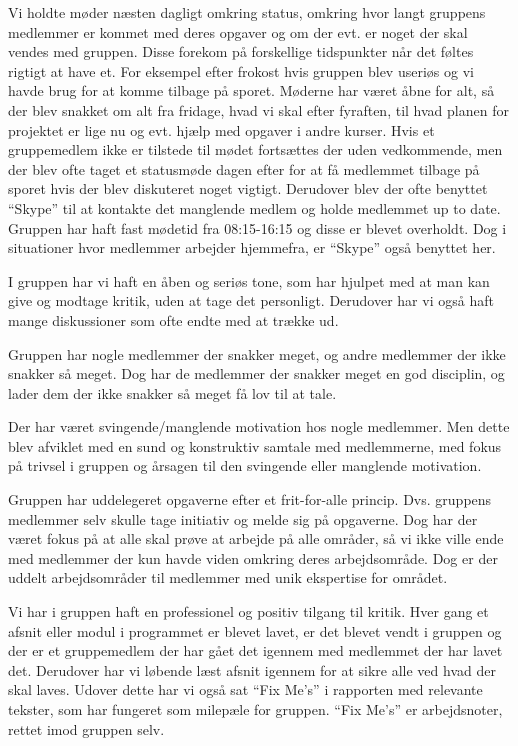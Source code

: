 \documentclass[a4paper,12pt,oneside]{article}
\begin{document}
Vi holdte møder næsten dagligt omkring status, omkring hvor langt gruppens medlemmer er kommet med deres opgaver og om der evt. er noget der skal vendes med gruppen. Disse forekom på forskellige tidspunkter når det føltes rigtigt at have et. For eksempel efter frokost hvis gruppen blev useriøs og vi havde brug for at komme tilbage på sporet. Møderne har været åbne for alt, så der blev snakket om alt fra fridage, hvad vi skal efter fyraften, til hvad planen for projektet er lige nu og evt. hjælp med opgaver i andre kurser. Hvis et gruppemedlem ikke er tilstede til mødet fortsættes der uden vedkommende, men der blev ofte taget et statusmøde dagen efter for at få medlemmet tilbage på sporet hvis der blev diskuteret noget vigtigt. Derudover blev der ofte benyttet \enquote{Skype} til at kontakte det manglende medlem og holde medlemmet up to date. Gruppen har haft fast mødetid fra 08:15-16:15 og disse er blevet overholdt. Dog i situationer hvor medlemmer arbejder hjemmefra, er \enquote{Skype} også benyttet her.

I gruppen har vi haft en åben og seriøs tone, som har hjulpet med at man kan give og modtage kritik, uden at tage det personligt. Derudover har vi også haft mange diskussioner som ofte endte med at trække ud.

Gruppen har nogle medlemmer der snakker meget, og andre medlemmer der ikke snakker så meget. Dog har de medlemmer der snakker meget en god disciplin, og lader dem der ikke snakker så meget få lov til at tale.

Der har været svingende/manglende motivation hos nogle medlemmer. Men dette blev afviklet med en sund og konstruktiv samtale med medlemmerne, med fokus på trivsel i gruppen og årsagen til den svingende eller manglende motivation.

Gruppen har uddelegeret opgaverne efter et frit-for-alle princip. Dvs. gruppens medlemmer selv skulle tage initiativ og melde sig på opgaverne. Dog har der været fokus på at alle skal prøve at arbejde på alle områder, så vi ikke ville ende med medlemmer der kun havde viden omkring deres arbejdsområde. Dog er der uddelt arbejdsområder til medlemmer med unik ekspertise for området.

Vi har i gruppen haft en professionel og positiv tilgang til kritik. Hver gang et afsnit eller modul i programmet er blevet lavet, er det blevet vendt i gruppen og der er et gruppemedlem der har gået det igennem med medlemmet der har lavet det. Derudover har vi løbende læst afsnit igennem for at sikre alle ved hvad der skal laves. Udover dette har vi også sat \enquote{Fix Me’s} i rapporten med relevante tekster, som har fungeret som milepæle for gruppen. \enquote{Fix Me’s} er arbejdsnoter, rettet imod gruppen selv.
\end{document}
